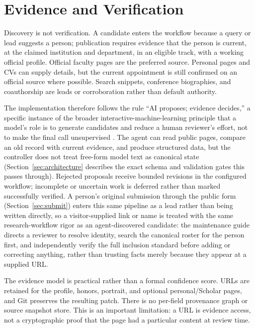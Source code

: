 \documentclass[11pt]{article}
\begin{document}
\section{Evidence and Verification}
\label{sec:evidence}
Discovery is not verification.
A candidate enters the workflow because a query or lead suggests a person; publication requires evidence that the person is current, at the claimed institution and department, in an eligible track, with a working official profile.
Official faculty pages are the preferred source.
Personal pages and CVs can supply details, but the current appointment is still confirmed on an official source where possible.
Search snippets, conference biographies, and coauthorship are leads or corroboration rather than default authority.

The implementation therefore follows the rule ``AI proposes; evidence decides,'' a specific instance of the broader interactive-machine-learning principle that a model's role is to generate candidates and reduce a human reviewer's effort, not to make the final call unsupervised \cite{amershi2014power}.
The agent can read public pages, compare an old record with current evidence, and produce structured data, but the controller does not treat free-form model text as canonical state (Section~\ref{sec:architecture} describes the exact schema and validation gates this passes through).
Rejected proposals receive bounded revisions in the configured workflow; incomplete or uncertain work is deferred rather than marked successfully verified.
A person's original submission through the public form (Section~\ref{sec:submit}) enters this same pipeline as a lead rather than being written directly, so a visitor-supplied link or name is treated with the same research-workflow rigor as an agent-discovered candidate: the maintenance guide directs a reviewer to resolve identity, search the canonical roster for the person first, and independently verify the full inclusion standard before adding or correcting anything, rather than trusting facts merely because they appear at a supplied URL.

The evidence model is practical rather than a formal confidence score.
URLs are retained for the profile, honors, portrait, and optional personal/Scholar pages, and Git preserves the resulting patch.
There is no per-field provenance graph or source snapshot store.
This is an important limitation: a URL is evidence access, not a cryptographic proof that the page had a particular content at review time.
\end{document}
